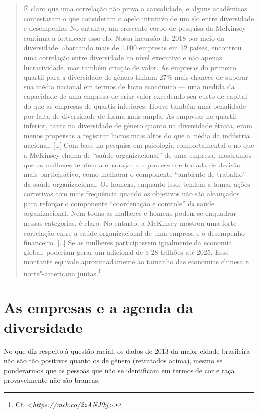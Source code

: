 \begin{quote}
É claro que uma correlação não prova a causalidade, e alguns acadêmicos
contestaram o que consideram o apelo intuitivo de um elo entre
diversidade e desempenho. No entanto, um crescente corpo de pesquisa da
McKinsey continua a fortalecer esse elo. Nossa incursão de 2018 por meio
da diversidade, abarcando mais de 1.000 empresas em 12 países, encontrou
uma correlação entre diversidade no nível executivo e não apenas
lucratividade, mas também criação de valor. As empresas do primeiro
quartil para a diversidade de gênero tinham 27\% mais chances de superar
sua média nacional em termos de lucro econômico --- uma medida da
capacidade de uma empresa de criar valor excedendo seu custo de capital
- do que as empresas de quartis inferiores. Houve também uma penalidade
por falta de diversidade de forma mais ampla. As empresas no quartil
inferior, tanto na diversidade de gênero quanto na diversidade étnica,
eram menos propensas a registrar lucros mais altos do que a média da
indústria nacional. {[}\ldots{}{]} Com base na pesquisa em psicologia
comportamental e no que a McKinsey chama de ``saúde organizacional'' de
uma empresa, mostramos que as mulheres tendem a encorajar um processo de
tomada de decisão mais participativo, como melhorar o componente
``ambiente de trabalho'' da saúde organizacional. Os homens, enquanto
isso, tendem a tomar ações corretivas com mais frequência quando os
objetivos não são alcançados para reforçar o componente ``coordenação e
controle'' da saúde organizacional. Nem todas as mulheres e homens podem
se enquadrar nessas categorias, é claro. No entanto, a McKinsey mostrou
uma forte correlação entre a saúde organizacional de uma empresa e o
desempenho financeiro. {[}\ldots{}{]} Se as mulheres participassem igualmente
da economia global, poderiam gerar um  adicional de \$ 28 trilhões
até 2025. Esse montante equivale aproximadamente ao tamanho das
economias chinesa e norte"-americana juntas.\footnote{Cf.
  \textless{}\emph{https://mck.co/2zANJ0y}\textgreater{}.}
\end{quote}

\chapter{As empresas e a agenda da diversidade}

No que diz respeito à questão racial, os dados de 2013 da maior cidade
brasileira não são tão positivos quanto os de gênero (retratados acima),
mesmo se ponderarmos que as pessoas que não se identificam em termos de
cor e raça provavelmente não são brancas.

